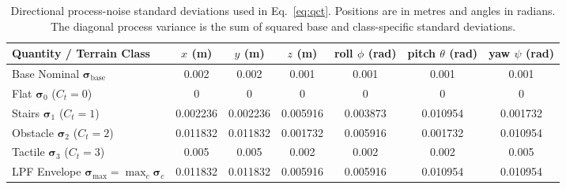 \documentclass[11pt, a4paper]{article}
\begin{document}
\begin{table}[htbp]
    \centering
    \caption{Directional process-noise standard deviations used in Eq.~\eqref{eq:qct}. Positions are in metres and angles in radians. The diagonal process variance is the sum of squared base and class-specific standard deviations.}
    \label{tab:process_noise}
    \footnotesize
    \begin{tabular}{lcccccc}
        \toprule
        \textbf{Quantity / Terrain Class} & $x$ (m) & $y$ (m) & $z$ (m) & roll $\phi$ (rad) & pitch $\theta$ (rad) & yaw $\psi$ (rad) \\
        \midrule
        Base Nominal $\bm{\sigma}_{\text{base}}$ & 0.002 & 0.002 & 0.001 & 0.001 & 0.001 & 0.001 \\
        Flat $\bm{\sigma}_{0}$ ($C_t=0$) & 0 & 0 & 0 & 0 & 0 & 0 \\
        Stairs $\bm{\sigma}_{1}$ ($C_t=1$) & 0.002236 & 0.002236 & 0.005916 & 0.003873 & 0.010954 & 0.001732 \\
        Obstacle $\bm{\sigma}_{2}$ ($C_t=2$) & 0.011832 & 0.011832 & 0.001732 & 0.005916 & 0.001732 & 0.010954 \\
        Tactile $\bm{\sigma}_{3}$ ($C_t=3$) & 0.005 & 0.005 & 0.002 & 0.002 & 0.002 & 0.005 \\
        \midrule
        LPF Envelope $\bm{\sigma}_{\max} = \max_c \bm{\sigma}_c$ & 0.011832 & 0.011832 & 0.005916 & 0.005916 & 0.010954 & 0.010954 \\
        \bottomrule
    \end{tabular}
\end{table}
\end{document}

